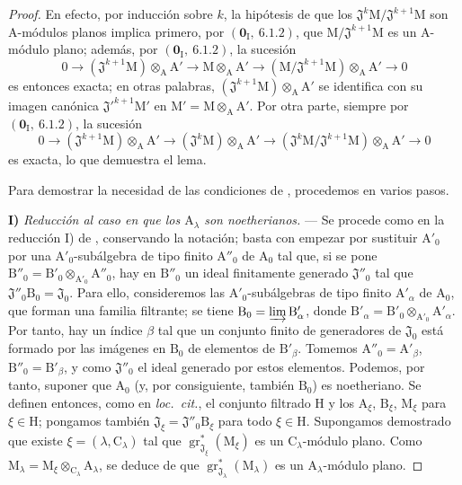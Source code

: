 \begin{proof}

En efecto, por inducción sobre $k$, la hipótesis de que los $\mathfrak{J}^k\mathrm{M}/\mathfrak{J}^{k+1}\mathrm{M}$ son A-módulos planos implica primero, por $(\mathbf{0}_\mathrm{I},~6.1.2)$, que $\mathrm{M}/\mathfrak{J}^{k+1}\mathrm{M}$ es un A-módulo plano; además, por $(\mathbf{0}_\mathrm{I},~6.1.2)$, la sucesión
\[
  0\to(\mathfrak{J}^{k+1}\mathrm{M})\otimes_\mathrm{A}\mathrm{A}'\to\mathrm{M}\otimes_\mathrm{A}\mathrm{A}'\to(\mathrm{M}/\mathfrak{J}^{k+1}\mathrm{M})\otimes_\mathrm{A}\mathrm{A}'\to 0
\]
es entonces exacta; en otras palabras, $(\mathfrak{J}^{k+1}\mathrm{M})\otimes_\mathrm{A}\mathrm{A}'$ se identifica con su imagen canónica $\mathfrak{J}'^{k+1}\mathrm{M}'$ en $\mathrm{M}'=\mathrm{M}\otimes_\mathrm{A}\mathrm{A}'$. Por otra parte, siempre por $(\mathbf{0}_\mathrm{I},~6.1.2)$, la sucesión
\[
  0\to(\mathfrak{J}^{k+1}\mathrm{M})\otimes_\mathrm{A}\mathrm{A}'\to(\mathfrak{J}^k\mathrm{M})\otimes_\mathrm{A}\mathrm{A}'\to(\mathfrak{J}^k\mathrm{M}/\mathfrak{J}^{k+1}\mathrm{M})\otimes_\mathrm{A}\mathrm{A}'\to 0
\]
es exacta, lo que demuestra el lema.

Para demostrar la necesidad de las condiciones de , procedemos en varios pasos.

\medskip
\noindent\textbf{I)} \emph{Reducción al caso en que los $\mathrm{A}_\lambda$
son noetherianos.} --- Se procede como en la reducción I) de
, conservando la notación; basta con empezar por sustituir
$\mathrm{A}'_0$ por una $\mathrm{A}'_0$-subálgebra de tipo finito
$\mathrm{A}''_0$ de $\mathrm{A}_0$ tal que, si se pone
$\mathrm{B}''_0=\mathrm{B}'_0\otimes_{\mathrm{A}'_0}\mathrm{A}''_0$, hay
en $\mathrm{B}''_0$ un ideal finitamente generado $\mathfrak{J}''_0$ tal que
$\mathfrak{J}''_0\mathrm{B}_0=\mathfrak{J}_0$. Para ello, consideremos las
$\mathrm{A}'_0$-subálgebras de tipo finito $\mathrm{A}'_\alpha$ de
$\mathrm{A}_0$, que forman una familia filtrante; se tiene
$\mathrm{B}_0=\varinjlim\mathrm{B}'_\alpha$, donde
$\mathrm{B}'_\alpha=\mathrm{B}'_0\otimes_{\mathrm{A}'_0}\mathrm{A}'_\alpha$.
Por tanto, hay un índice $\beta$ tal que un conjunto finito de generadores de
$\mathfrak{J}_0$ está formado por las imágenes en $\mathrm{B}_0$ de elementos de
$\mathrm{B}'_\beta$. Tomemos $\mathrm{A}''_0=\mathrm{A}'_\beta$,
$\mathrm{B}''_0=\mathrm{B}'_\beta$, y como $\mathfrak{J}''_0$ el ideal
generado por estos elementos. Podemos, por tanto, suponer que $\mathrm{A}_0$
(y, por consiguiente, también $\mathrm{B}_0$) es noetheriano. Se definen entonces, como en
\emph{loc.\ cit.}, el conjunto filtrado $\mathrm{H}$ y los $\mathrm{A}_\xi$,
$\mathrm{B}_\xi$, $\mathrm{M}_\xi$ para $\xi\in\mathrm{H}$; pongamos también
$\mathfrak{J}_\xi=\mathfrak{J}''_0\mathrm{B}_\xi$ para todo
$\xi\in\mathrm{H}$. Supongamos demostrado que existe
$\xi=(\lambda,\mathrm{C}_\lambda)$ tal que
$\operatorname{gr}^*_{\mathfrak{J}_\xi}(\mathrm{M}_\xi)$ es un
$\mathrm{C}_\lambda$-módulo plano. Como
$\mathrm{M}_\lambda=\mathrm{M}_\xi\otimes_{\mathrm{C}_\lambda}
\mathrm{A}_\lambda$, se deduce de  que
$\operatorname{gr}^*_{\mathfrak{J}_\lambda}(\mathrm{M}_\lambda)$ es un
$\mathrm{A}_\lambda$-módulo plano.


\end{proof}
